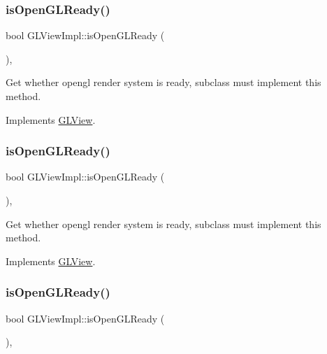 \subsubsection{\texorpdfstring{is\+Open\+G\+L\+Ready()}{isOpenGLReady()}\hspace{0.1cm}{\footnotesize\ttfamily [1/9]}}
{\footnotesize\ttfamily bool G\+L\+View\+Impl\+::is\+Open\+G\+L\+Ready (\begin{DoxyParamCaption}{ }\end{DoxyParamCaption})\hspace{0.3cm}{\ttfamily [override]}, {\ttfamily [virtual]}}

Get whether opengl render system is ready, subclass must implement this method. 

Implements \hyperlink{classGLView_a23326d6cbff86205a0d5fa953557838d}{G\+L\+View}.

\mbox{\label{classGLViewImpl_a037047e04b2070c1c6d874756a978a02}} 
\subsubsection{\texorpdfstring{is\+Open\+G\+L\+Ready()}{isOpenGLReady()}\hspace{0.1cm}{\footnotesize\ttfamily [2/9]}}
{\footnotesize\ttfamily bool G\+L\+View\+Impl\+::is\+Open\+G\+L\+Ready (\begin{DoxyParamCaption}{ }\end{DoxyParamCaption})\hspace{0.3cm}{\ttfamily [override]}, {\ttfamily [virtual]}}

Get whether opengl render system is ready, subclass must implement this method. 

Implements \hyperlink{classGLView_a23326d6cbff86205a0d5fa953557838d}{G\+L\+View}.

\mbox{\label{classGLViewImpl_a037047e04b2070c1c6d874756a978a02}} 
\subsubsection{\texorpdfstring{is\+Open\+G\+L\+Ready()}{isOpenGLReady()}\hspace{0.1cm}{\footnotesize\ttfamily [3/9]}}
{\footnotesize\ttfamily bool G\+L\+View\+Impl\+::is\+Open\+G\+L\+Ready (\begin{DoxyParamCaption}{ }\end{DoxyParamCaption})\hspace{0.3cm}{\ttfamily [override]}, {\ttfamily [virtual]}}

